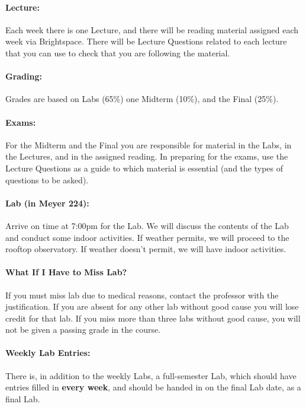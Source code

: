 \paragraph{Lecture:} Each week there is one Lecture, and
there will be reading material assigned each week via Brightspace.
There will be Lecture Questions related to each lecture that
you can use to check that you are following the material.

\paragraph{Grading:} Grades are based on Labs (65\%) 
one Midterm (10\%), and the Final (25\%).

\paragraph{Exams:} For the Midterm and the Final you are
responsible for material in the Labs, in the Lectures, and in the assigned reading.
In preparing for the exams, use the Lecture Questions as a
guide to which material is essential (and the types of
questions to be asked).

\paragraph{Lab (in Meyer 224):} Arrive on time at 7:00pm for
the Lab. We will discuss the contents of the Lab and conduct some
indoor activities. If weather permits, we will proceed to the rooftop
observatory. If weather doesn't permit, we will have indoor
activities.

\paragraph{What If I Have to Miss Lab?} If you must miss lab due
to medical reasons, contact the
professor with the justification. If you are absent for any other lab
without good cause you will lose credit for that lab. If you miss
more than three labs without good cause, you will not be given a
passing grade in the course.

\paragraph{Weekly Lab Entries:} There is, in addition to the weekly
Labs, a full-semester Lab, which
should have entries filled in {\bf every week}, and should be handed
in on the final Lab date, as a final Lab.

